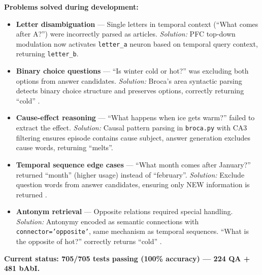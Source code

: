 \documentclass[11pt]{article}
\begin{document}
\textbf{Problems solved during development:}
\begin{itemize}
\item \textbf{Letter disambiguation} --- Single letters in temporal context (``What comes after A?'') 
      were incorrectly parsed as articles. \textit{Solution:} PFC top-down modulation now activates 
      \texttt{letter\_a} neuron based on temporal query context, returning \texttt{letter\_b}.
\item \textbf{Binary choice questions} --- ``Is winter cold or hot?'' was excluding both options 
      from answer candidates. \textit{Solution:} Broca's area syntactic parsing detects binary choice structure
      and preserves options, correctly returning ``cold'' \citep{friederici2011brain}.
\item \textbf{Cause-effect reasoning} --- ``What happens when ice gets warm?'' failed to extract 
      the effect. \textit{Solution:} Causal pattern parsing in \texttt{broca.py} with CA3 filtering ensures
      episode contains cause subject, answer generation excludes cause words, returning ``melts''.
\item \textbf{Temporal sequence edge cases} --- ``What month comes after January?'' returned 
      ``month'' (higher usage) instead of ``february''. \textit{Solution:} Exclude question words from 
      answer candidates, ensuring only NEW information is returned \citep{eichenbaum2014time}.
\item \textbf{Antonym retrieval} --- Opposite relations required special handling.
      \textit{Solution:} Antonymy encoded as semantic connections with \texttt{connector='opposite'},
      same mechanism as temporal sequences. ``What is the opposite of hot?'' correctly returns ``cold''
      \citep{murphy2003semantic}.
\end{itemize}

\textbf{Current status: 705/705 tests passing (100\% accuracy) --- 224 QA + 481 bAbI.}
\end{document}
